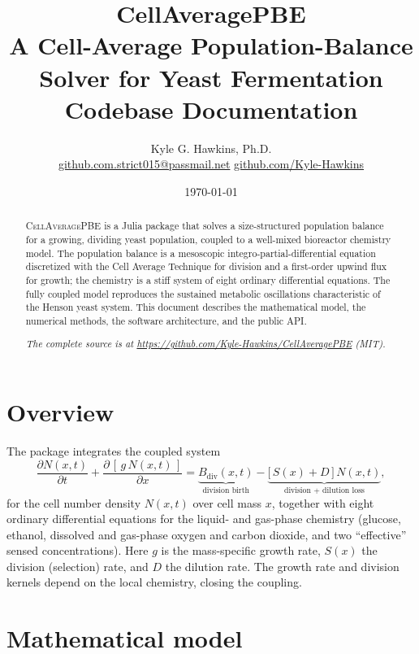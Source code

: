 \documentclass[11pt,a4paper]{article}
\title{\textbf{CellAveragePBE}\\[0.3em]
  \large A Cell-Average Population-Balance Solver for Yeast Fermentation\\[0.2em]
  \normalsize Codebase Documentation}
\author{Kyle G. Hawkins, Ph.D.\\[0.3em]
  \normalsize \href{mailto:github.com.strict015@passmail.net}{github.com.strict015@passmail.net}
  \quad\textbullet\quad
  \href{https://github.com/Kyle-Hawkins}{github.com/Kyle-Hawkins}}
\date{\today}
\begin{document}
\maketitle

\begin{abstract}
\noindent\textsc{CellAveragePBE} is a Julia package that solves a size-structured population
balance for a growing, dividing yeast population, coupled to a well-mixed bioreactor chemistry
model. The population balance is a mesoscopic integro-partial-differential equation discretized with
the Cell Average Technique for division and a first-order upwind flux for growth; the chemistry is a
stiff system of eight ordinary differential equations. The fully coupled model reproduces the
sustained metabolic oscillations characteristic of the Henson yeast system. This document describes
the mathematical model, the numerical methods, the software architecture, and the public API.

\vspace{0.5em}
\noindent\textit{The complete source is at \url{https://github.com/Kyle-Hawkins/CellAveragePBE} (MIT).}
\end{abstract}

\tableofcontents
\vspace{1em}

\section{Overview}
The package integrates the coupled system
\begin{equation}
\frac{\partial N(x,t)}{\partial t} + \frac{\partial\,[\,g\,N(x,t)\,]}{\partial x}
   = \underbrace{B_{\mathrm{div}}(x,t)}_{\text{division birth}}
   - \underbrace{\big[\,S(x) + D\,\big]\,N(x,t)}_{\text{division + dilution loss}},
\label{eq:pbe}
\end{equation}
for the cell number density $N(x,t)$ over cell mass $x$, together with eight ordinary differential
equations for the liquid- and gas-phase chemistry (glucose, ethanol, dissolved and gas-phase oxygen
and carbon dioxide, and two ``effective'' sensed concentrations). Here $g$ is the mass-specific
growth rate, $S(x)$ the division (selection) rate, and $D$ the dilution rate. The growth rate and
division kernels depend on the local chemistry, closing the coupling.

\section{Mathematical model}
\end{document}
